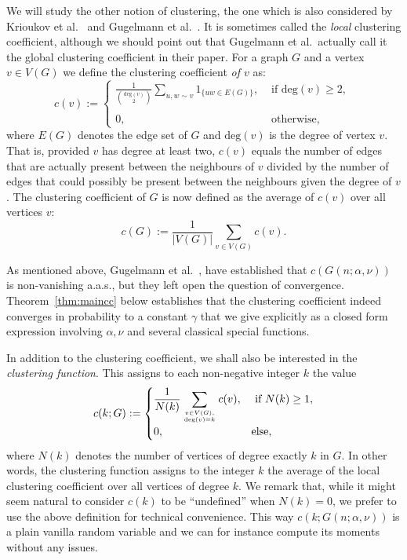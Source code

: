 We will study the other notion of clustering, the one which is also considered by Krioukov et al.~\cite{krioukov2010hyperbolic} and Gugelmann et al.~\cite{gugelmann2012random}. It is sometimes called the {\em local} clustering coefficient, although we should point out that Gugelmann et al.~actually call it the global clustering coefficient in their paper. For a graph $G$ and a vertex $v\in V(G)$ we define the clustering coefficient {\em of $v$} as:
\[
	c(v) := \left\{\begin{array}{cl}
		\displaystyle \frac{1}{{\text{deg}(v)\choose 2}} \sum_{u,w\sim v} 1_{\{uw \in E(G)\}}, 
			& \text{ if $\text{deg}(v) \geq 2$, }\\
		& \\
        0, & \text{ otherwise,}
        \end{array}\right.
\]
where $E(G)$ denotes the edge set of $G$ and $\text{deg}(v)$ is the degree of vertex $v$. That is, provided $v$ has degree at least two, $c(v)$ equals the number of edges that are actually present between the neighbours of $v$ divided by the number of edges that could possibly be present between the neighbours given the degree of $v$.
The clustering coefficient of $G$ is now defined as the average of $c(v)$ over all vertices $v$:
\[
	c(G) := \frac{1}{|V(G)|} \sum_{v\in V(G)} c(v).
\]

As mentioned above, Gugelmann et al.~\cite{gugelmann2012random}, have established that $c(G(n;\alpha,\nu))$ is non-vanishing a.a.s., but they left open the question of convergence. Theorem~\ref{thm:maincc} below establishes that the clustering coefficient indeed converges in probability to a constant $\gamma$ that we give explicitly as a closed form expression involving $\alpha,\nu$ and several classical special functions.

In addition to the clustering coefficient, we shall also be interested in the {\em clustering function}.
This assigns to each non-negative integer $k$ the value
\begin{equation}\label{eq:def_clustering_function}
	c(k; G) := \begin{cases}
		\displaystyle \frac{1}{N(k)} \sum_{v \in V(G), \atop \text{deg}(v)=k}  c(v),  &\mbox{ if } N(k) \ge 1,\\
		0, &\mbox{else,}
	\end{cases}
\end{equation}
where $N(k)$ denotes the number of vertices of degree exactly $k$ in $G$. In other words, the clustering function assigns to the integer $k$ the average of the local clustering coefficient over all vertices of degree $k$. We remark that, while it might seem natural to consider $c(k)$ to be ``undefined'' when $N(k)=0$, we prefer to use the above definition for technical 
convenience.  This way $c(k; G(n;\alpha,\nu) )$ is a plain vanilla random variable and we can for instance compute its moments without any issues.


